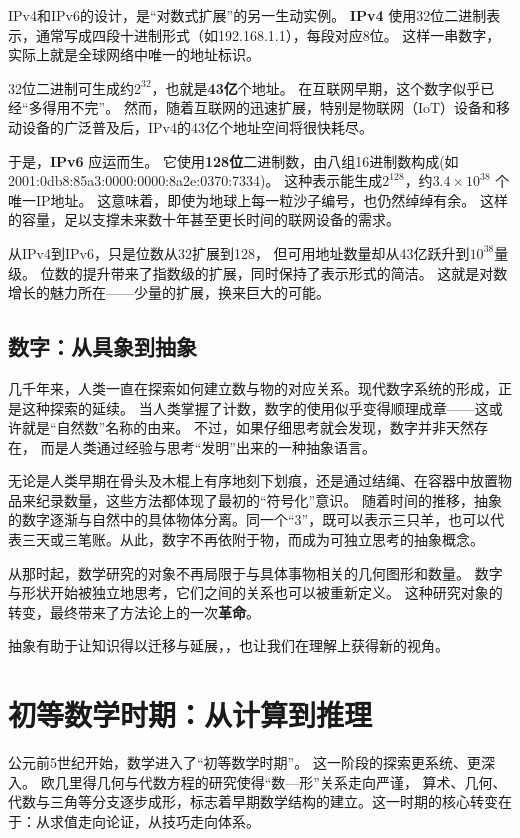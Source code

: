 IPv4和IPv6的设计，是“对数式扩展”的另一生动实例。  
{\bf IPv4} 使用32位二进制表示，通常写成四段十进制形式（如192.168.1.1），每段对应8位。  这样一串数字，实际上就是全球网络中唯一的地址标识。

32位二进制可生成约$2^{32}$，也就是{\bf 43亿}个地址。  
在互联网早期，这个数字似乎已经“多得用不完”。  
然而，随着互联网的迅速扩展，特别是物联网（IoT）设备和移动设备的广泛普及后，IPv4的43亿个地址空间将很快耗尽。  


于是，{\bf IPv6} 应运而生。  
它使用{\bf 128位}二进制数，由八组16进制数构成(如 2001:0db8:85a3:0000:0000:8a2e:0370:7334)。
这种表示能生成$2^{128}$，约{\bf $3.4 \times 10^{38} $} 个唯一IP地址。  
这意味着，即使为地球上每一粒沙子编号，也仍然绰绰有余。  
这样的容量，足以支撑未来数十年甚至更长时间的联网设备的需求。 








从IPv4到IPv6，只是位数从32扩展到128，  
但可用地址数量却从43亿跃升到$10^{38}$量级。  
位数的提升带来了指数级的扩展，同时保持了表示形式的简洁。  
这就是对数增长的魅力所在——少量的扩展，换来巨大的可能。  




\subsection{数字：从具象到抽象}

几千年来，人类一直在探索如何建立数与物的对应关系。现代数字系统的形成，正是这种探索的延续。
当人类掌握了计数，数字的使用似乎变得顺理成章——这或许就是“自然数”名称的由来。  
不过，如果仔细思考就会发现，数字并非天然存在，  
而是人类通过经验与思考“发明”出来的一种抽象语言。

无论是人类早期在骨头及木棍上有序地刻下划痕，还是通过结绳、在容器中放置物品来纪录数量，这些方法都体现了最初的“符号化”意识。 
随着时间的推移，抽象的数字逐渐与自然中的具体物体分离。同一个“3”，既可以表示三只羊，也可以代表三天或三笔账。从此，数字不再依附于物，而成为可独立思考的抽象概念。




从那时起，数学研究的对象不再局限于与具体事物相关的几何图形和数量。 
数字与形状开始被独立地思考，它们之间的关系也可以被重新定义。  
这种研究对象的转变，最终带来了方法论上的一次{\bf 革命}。



抽象有助于让知识得以迁移与延展，，也让我们在理解上获得新的视角。  

\section{初等数学时期：从计算到推理}
公元前5世纪开始，数学进入了“初等数学时期”。  
这一阶段的探索更系统、更深入。
欧几里得几何与代数方程的研究使得“数—形”关系走向严谨，  
算术、几何、代数与三角等分支逐步成形，标志着早期数学结构的建立。这一时期的核心转变在于：从求值走向论证，从技巧走向体系。

